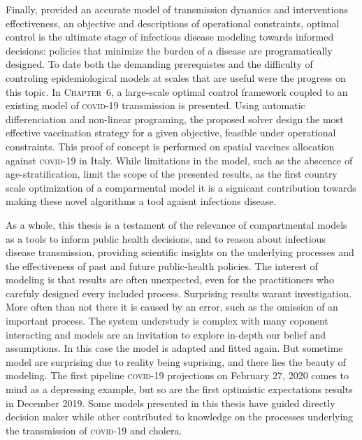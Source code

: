 Finally, provided an accurate model of transmission dynamics and interventions effectiveness, an objective and descriptions of operational constraints, optimal control is the ultimate stage of infectious disease modeling towards informed decisions: policies that minimize the burden of a disease are programatically designed. To date both the demanding prerequistes and the difficulty of controling epidemiological models at scales that are useful were the progress on this topic. In \textsc{Chapter~6}, a large-scale optimal control framework coupled to an existing model of \textsc{covid}-19 transmission is presented.  Using automatic differenciation and non-linear programing, the proposed solver design the most effective vaccination strategy for a given objective, feasible under operational constraints. This proof of concept is performed on spatial  vaccines allocation against \textsc{covid}-19 in Italy. While limitations in the model, such as the abscence of age-stratification, limit the scope of the presented results, as the first country scale optimization of a comparmental model it is a signicant contribution towards making these novel algorithms a tool agaisnt infections disease.


As a whole, this thesis is a testament of the relevance of compartmental models as a tools to inform public health decisions, and to reason about infectious disease transmission, providing scientific insights on the underlying processes and the effectiveness of past and future public-health policies. %
The interest of modeling is that results are often unexpected, even for the practitioners who carefuly designed every included process. Surprising results warant investigation. More often than not there it is caused by an error, such as the omission of an important process. The system understudy is complex with many coponent interacting and models are an invitation to explore in-depth our belief and assumptions. In this case the model is adapted and fitted again. But sometime model are surprising due to reality being suprising, and there lies the beauty of modeling. The first pipeline \textsc{covid}-19 projections on February 27, 2020 comes to mind as a depressing example, but so are the first optimistic expectations results in December 2019. Some models presented in this thesis have guided directly decision maker while other contributed to knowledge on the processes underlying the transmission of \textsc{covid}-19 and cholera.

